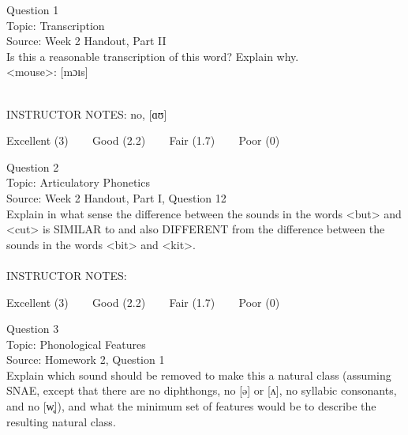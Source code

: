 \documentclass[12pt]{article}
\begin{document}
\begin{center}
\textbf{{\color{blue}{\HUGE START OF EXAM\\}}}

\textbf{{\color{blue}{\HUGE Student ID: 79667\\}}}

\textbf{{\color{blue}{\HUGE \\}}}

\end{center}
\newpage

{\large Question 1}\\

Topic: Transcription\\
Source: Week 2 Handout, Part II\\

Is this a reasonable transcription of this word? Explain why.\\

<mouse>: {[mɔɪs]}


~\\
INSTRUCTOR NOTES: no, [ɑʊ]


\vfill
Excellent (3) ~~~ Good (2.2) ~~~ Fair (1.7) ~~~ Poor (0)
\newpage

{\large Question 2}\\

Topic: Articulatory Phonetics\\
Source: Week 2 Handout, Part I, Question 12\\

Explain in what sense the difference between the sounds in the words <but> and <cut> is SIMILAR to and also DIFFERENT from the difference between the sounds in the words <bit> and <kit>.\\


~\\
INSTRUCTOR NOTES: 


\vfill
Excellent (3) ~~~ Good (2.2) ~~~ Fair (1.7) ~~~ Poor (0)
\newpage

{\large Question 3}\\

Topic: Phonological Features\\
Source: Homework 2, Question 1\\

Explain which sound should be removed to make this a natural class (assuming SNAE, except that there are no diphthongs, no [ə] or [ʌ], no syllabic consonants, and no [w̥]), and what the minimum set of features would be to describe the resulting natural class.\\
\end{document}
